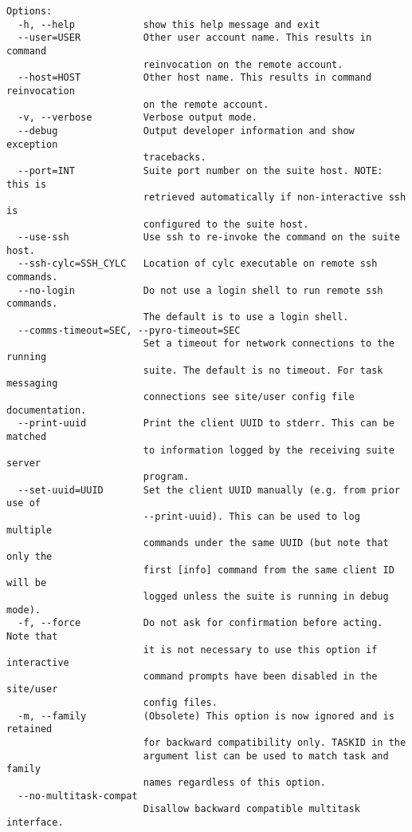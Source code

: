 \begin{lstlisting}
Options:
  -h, --help            show this help message and exit
  --user=USER           Other user account name. This results in command
                        reinvocation on the remote account.
  --host=HOST           Other host name. This results in command reinvocation
                        on the remote account.
  -v, --verbose         Verbose output mode.
  --debug               Output developer information and show exception
                        tracebacks.
  --port=INT            Suite port number on the suite host. NOTE: this is
                        retrieved automatically if non-interactive ssh is
                        configured to the suite host.
  --use-ssh             Use ssh to re-invoke the command on the suite host.
  --ssh-cylc=SSH_CYLC   Location of cylc executable on remote ssh commands.
  --no-login            Do not use a login shell to run remote ssh commands.
                        The default is to use a login shell.
  --comms-timeout=SEC, --pyro-timeout=SEC
                        Set a timeout for network connections to the running
                        suite. The default is no timeout. For task messaging
                        connections see site/user config file documentation.
  --print-uuid          Print the client UUID to stderr. This can be matched
                        to information logged by the receiving suite server
                        program.
  --set-uuid=UUID       Set the client UUID manually (e.g. from prior use of
                        --print-uuid). This can be used to log multiple
                        commands under the same UUID (but note that only the
                        first [info] command from the same client ID will be
                        logged unless the suite is running in debug mode).
  -f, --force           Do not ask for confirmation before acting. Note that
                        it is not necessary to use this option if interactive
                        command prompts have been disabled in the site/user
                        config files.
  -m, --family          (Obsolete) This option is now ignored and is retained
                        for backward compatibility only. TASKID in the
                        argument list can be used to match task and family
                        names regardless of this option.
  --no-multitask-compat
                        Disallow backward compatible multitask interface.
\end{lstlisting}
